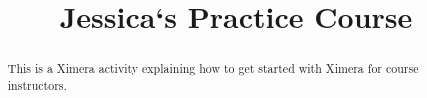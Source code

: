 \documentclass{xourse}
\title{Jessica`s Practice Course}%
\begin{document}
\begin{abstract} %

This is a Ximera activity explaining how to get started with Ximera for course instructors.

\end{abstract}

\maketitle



\end{document}
